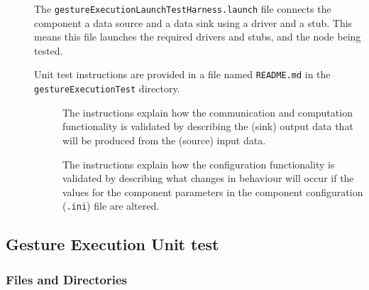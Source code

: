 \documentclass{CSSRforAfrica}
\newcommand{\checkboxChecked}{\fbox{\ding{51}}} %
\newcommand{\checkboxDashed}{\fbox{--}}         %
\begin{document}
\begin{description}
\item[\checkboxDashed] The {\small \verb+gestureExecutionLaunchTestHarness.launch+} file  connects the component a data source and a data sink using a driver and a stub.   This means this file launches the required drivers and stubs, and the node being tested.

\item[\checkboxChecked] Unit test instructions are provided in a file named {\small \verb+README.md+} in the  {\small \verb+gestureExecutionTest+} directory. 


\begin{description}

\item[\checkboxChecked] The instructions explain how the communication and computation functionality is validated by describing the (sink) output data that will be produced from the (source) input data.  

\item[\checkboxChecked] The instructions explain how the configuration functionality is validated by describing what changes in behaviour will occur if the values for the component parameters in the component configuration ({\small \verb+.ini+}) file are altered.

\end{description}

\end{description} 


  
%  


 \subsection{Gesture Execution Unit test} 
\label{subsection:gesture_execution_test}


\subsubsection{Files and Directories}
\label{subsubsection:gesture_execution_test_files}
 
\end{document}
